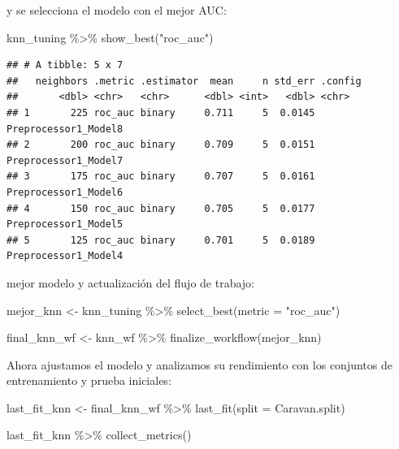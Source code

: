 \documentclass[
  12pt,
]{book}
\newenvironment{Shaded}{\begin{snugshade}}{\end{snugshade}}
\newcommand{\AttributeTok}[1]{\textcolor[rgb]{0.77,0.63,0.00}{#1}}
\newcommand{\FunctionTok}[1]{\textcolor[rgb]{0.00,0.00,0.00}{#1}}
\newcommand{\NormalTok}[1]{#1}
\newcommand{\OtherTok}[1]{\textcolor[rgb]{0.56,0.35,0.01}{#1}}
\newcommand{\SpecialCharTok}[1]{\textcolor[rgb]{0.00,0.00,0.00}{#1}}
\newcommand{\StringTok}[1]{\textcolor[rgb]{0.31,0.60,0.02}{#1}}
\begin{document}
y se selecciona el modelo con el mejor AUC:

\begin{Shaded}
\begin{Highlighting}[]
\NormalTok{knn\_tuning }\SpecialCharTok{\%\textgreater{}\%}
    \FunctionTok{show\_best}\NormalTok{(}\StringTok{"roc\_auc"}\NormalTok{)}
\end{Highlighting}
\end{Shaded}

\begin{verbatim}
## # A tibble: 5 x 7
##   neighbors .metric .estimator  mean     n std_err .config             
##       <dbl> <chr>   <chr>      <dbl> <int>   <dbl> <chr>               
## 1       225 roc_auc binary     0.711     5  0.0145 Preprocessor1_Model8
## 2       200 roc_auc binary     0.709     5  0.0151 Preprocessor1_Model7
## 3       175 roc_auc binary     0.707     5  0.0161 Preprocessor1_Model6
## 4       150 roc_auc binary     0.705     5  0.0177 Preprocessor1_Model5
## 5       125 roc_auc binary     0.701     5  0.0189 Preprocessor1_Model4
\end{verbatim}

mejor modelo y actualización del flujo de trabajo:

\begin{Shaded}
\begin{Highlighting}[]
\NormalTok{mejor\_knn }\OtherTok{\textless{}{-}}\NormalTok{ knn\_tuning }\SpecialCharTok{\%\textgreater{}\%}
    \FunctionTok{select\_best}\NormalTok{(}\AttributeTok{metric =} \StringTok{"roc\_auc"}\NormalTok{)}

\NormalTok{final\_knn\_wf }\OtherTok{\textless{}{-}}\NormalTok{ knn\_wf }\SpecialCharTok{\%\textgreater{}\%}
    \FunctionTok{finalize\_workflow}\NormalTok{(mejor\_knn)}
\end{Highlighting}
\end{Shaded}

Ahora ajustamos el modelo y analizamos su rendimiento con los conjuntos
de entrenamiento y prueba iniciales:

\begin{Shaded}
\begin{Highlighting}[]
\NormalTok{last\_fit\_knn }\OtherTok{\textless{}{-}}\NormalTok{ final\_knn\_wf }\SpecialCharTok{\%\textgreater{}\%}
    \FunctionTok{last\_fit}\NormalTok{(}\AttributeTok{split =}\NormalTok{ Caravan.split)}

\NormalTok{last\_fit\_knn }\SpecialCharTok{\%\textgreater{}\%}
    \FunctionTok{collect\_metrics}\NormalTok{()}
\end{Highlighting}
\end{Shaded}
\end{document}
